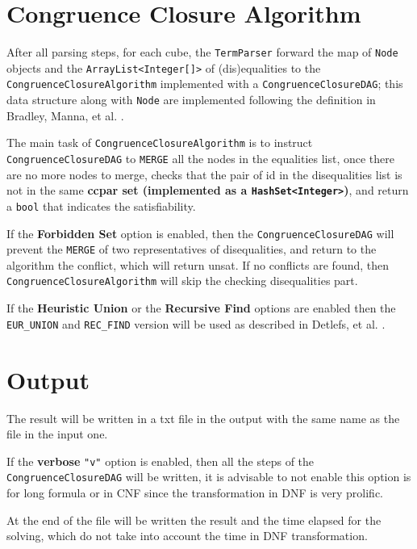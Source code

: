 \documentclass[11pt,a4paper]{article}
\begin{document}
    \section{Congruence Closure Algorithm}

    After all parsing steps, for each cube, the \texttt{TermParser} forward the map of \texttt{Node} objects and the \texttt{ArrayList<Integer[]>} of (dis)equalities to the \texttt{CongruenceClosureAlgorithm} implemented with a \texttt{CongruenceClosureDAG}; this data structure along with \texttt{Node} are implemented following the definition in Bradley, Manna, et al. \cite{calculusOfComputation}.

    The main task of \texttt{CongruenceClosureAlgorithm} is to instruct \texttt{CongruenceClosureDAG} to \texttt{MERGE} all the nodes in the equalities list, once there are no more nodes to merge, checks that the pair of id in the disequalities list is not in the same \textbf{ccpar set (implemented as a \texttt{HashSet<Integer>})}, and return a \texttt{bool} that indicates the satisfiability.

    If the \textbf{Forbidden Set} option is enabled, then the \texttt{CongruenceClosureDAG} will prevent the \texttt{MERGE} of two representatives of disequalities, and return to the algorithm the conflict, which will return unsat. If no conflicts are found, then \texttt{CongruenceClosureAlgorithm} will skip the checking disequalities part.

    If the \textbf{Heuristic Union} or the \textbf{Recursive Find} options are enabled then the \texttt{EUR\_UNION} and \texttt{REC\_FIND} version will be used as described in Detlefs, et al. \cite{simplify}.

    \section{Output}

    The result will be written in a txt file in the output with the same name as the file in the input one.
    
    If the \textbf{verbose} \texttt{"v"} option is enabled, then all the steps of the \texttt{CongruenceClosureDAG} will be written, it is advisable to not enable this option is for long formula or in CNF since the transformation in DNF is very prolific.
    
    At the end of the file will be written the result and the time elapsed for the solving, which do not take into account the time in DNF transformation.
\end{document}
